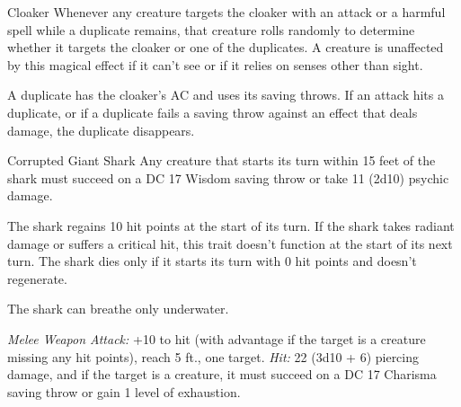 \documentclass[10pt,a4paper,twoside,fancy,bg=print,twocolumn,openany,nodeprecatedcode]{dndbook}
\begin{document}
\begin{DndMonster}[float=t]{Cloaker}
Whenever any creature targets the cloaker with an attack or a harmful spell while a duplicate remains, that creature rolls randomly to determine whether it targets the cloaker or one of the duplicates. A creature is unaffected by this magical effect if it can't see or if it relies on senses other than sight.

A duplicate has the cloaker's AC and uses its saving throws. If an attack hits a duplicate, or if a duplicate fails a saving throw against an effect that deals damage, the duplicate disappears.

\end{DndMonster}



\begin{DndMonster}[float=t]{Corrupted Giant Shark}
\DndMonsterBasics[
armor-class = {13 (natural armor)},
hit-points = {\DndDice{11d12 + 55}},
speed = {0 ft., swim 50 ft.}
]
\DndMonsterAbilityScores[
 str = 23,
 dex = 11,
 con = 21,
 int = 1,
 wis = 10,
 cha = 5
]
\DndMonsterDetails[
skills = {Perception +4},
senses = {blindsight 60 ft., passive perception 14},
challenge = 9,
]
Any creature that starts its turn within 15 feet of the shark must succeed on a DC 17 Wisdom saving throw or take 11 (2d10) psychic damage.

The shark regains 10 hit points at the start of its turn. If the shark takes radiant damage or suffers a critical hit, this trait doesn't function at the start of its next turn. The shark dies only if it starts its turn with 0 hit points and doesn't regenerate.

The shark can breathe only underwater.

\textsl{Melee Weapon Attack:} +10 to hit (with advantage if the target is a creature missing any hit points), reach 5 ft., one target. \textsl{Hit:} 22 (3d10 + 6) piercing damage, and if the target is a creature, it must succeed on a DC 17 Charisma saving throw or gain 1 level of exhaustion.

\end{DndMonster}
\end{document}
